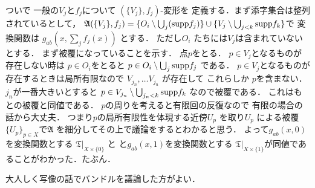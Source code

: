 \documentclass[leqno]{jsarticle}
\newcommand{\supp}{\text{{\rm supp}}}
\begin{document}
ついで
一般の$V_{j}$と$f_{j}$について
$(\{V_{j}\}, f_{j})$-変形を
定義する．まず添字集合は整列されているとして，
$\mathfrak{A}(\{V_{j}\}, f_{j})=\{O_{i}\setminus \bigcup_{j} (\supp f_{j})\}\cup \{V_{j}\setminus 
\bigcup_{j<k}\supp f_{k}\}$で
変換関数は
$g_{ab}\left(x, \sum_{j}f_{j}(x)\right)$
とする．
ただし$O_{i}$
たちには$V_{j}$は含まれていないとする．
まず被覆になっていることを示す．
点$p$をとる．
$p\in V_{j}$となるものが存在しない時は
$p\in O_{i}$をとると
$p\in O_{i}\setminus \bigcup_{j}\supp f_{j}$
である．
$p\in V_{j}$となるものが存在するときは局所有限なので
$V_{j_{n}}, \dots V_{j_{n}}$
が存在して これらしか
$p$を含まない．
$j_{n}$が一番大きいとすると
$p\in V_{j_{n}}\setminus \bigcup_{j_{n}<k}\supp f_{k}$
なので被覆である．
これはもとの被覆と同値である．
$p$の周りを考えると有限回の反復なので
有限の場合の話から大丈夫．
つまり$p$の局所有限性を体現する近傍$U_{p}$
を取り$U_{p}$
による被覆
$\{U_{p}\}_{p\in X}$で$\mathfrak{A}$
を細分してその上で議論をするとわかると思う．
よって$g_{ab}(x, 0)$を変換関数とする
$\mathfrak{T}|_{X\times \{0\}}$
と
と$g_{ab}(x, 1)$を変換関数とする
$\mathfrak{T}|_{X\times \{1\}}$が同値であることがわかった．たぶん．

大人しく写像の話でバンドルを議論した方がよい．






\nocite{*}





			
\end{document}
